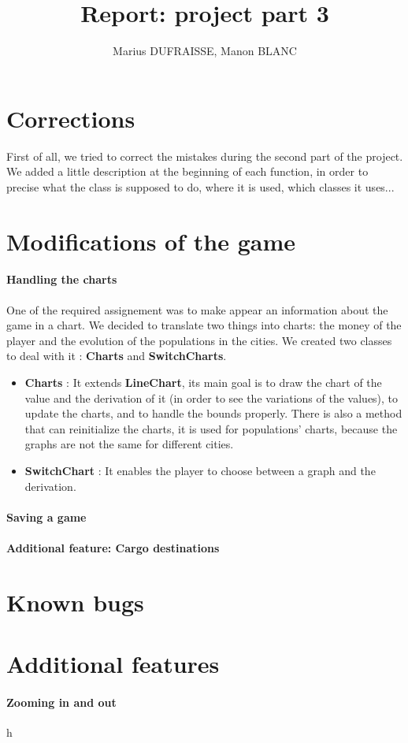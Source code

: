 \documentclass[a4paper]{article}
\title{Report: project part 3}
\author{Marius DUFRAISSE, Manon BLANC}
\date{  }
\begin{document}
	\maketitle
	\thispagestyle{fancy}
	\section{Corrections}
	
	First of all, we tried to correct the mistakes during the second part of the project. We added a little description at the beginning of each function, in order to precise what the class is supposed to do, where it is used, which classes it uses...
	
	\section{Modifications of the game}
	
	\paragraph{Handling the charts} 
	One of the required assignement was to make appear an information about the game in a chart. We decided to translate two things into charts: the money of the player and the evolution of the populations in the cities. We created two classes to deal with it : \textbf{Charts} and \textbf{SwitchCharts}. 
	\begin{itemize}
		\item \textbf{Charts }: It extends \textbf{LineChart}, its main goal is to draw the chart of the value and the derivation of it (in order to see the variations of the values), to update the charts, and to handle the bounds properly. There is also a method that can reinitialize the charts, it is used for populations' charts, because the graphs are not the same for different cities.
		\item \textbf{SwitchChart} : It enables the player to choose between a graph and the derivation. 
	\end{itemize} 
	\paragraph{Saving a game}
	\paragraph{Additional feature: Cargo destinations}
	
	\section{Known bugs}
	
	\section{Additional features}
	\paragraph{Zooming in and out}
	h
	
	
	
\end{document}
